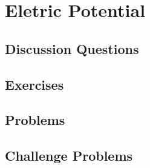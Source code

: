 
\chapter{Eletric Potential}

\section{Discussion Questions}

\section{Exercises}

\section{Problems}

\section{Challenge Problems}
